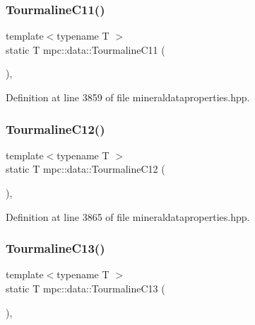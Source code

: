 \subsubsection{\texorpdfstring{Tourmaline\+C11()}{TourmalineC11()}}
{\footnotesize\ttfamily template$<$typename T $>$ \\
static T mpc\+::data\+::\+Tourmaline\+C11 (\begin{DoxyParamCaption}{ }\end{DoxyParamCaption})\hspace{0.3cm}{\ttfamily [inline]}, {\ttfamily [static]}}



Definition at line 3859 of file mineraldataproperties.\+hpp.

\mbox{\label{namespacempc_1_1data_aa3e3d8143e854e6265bc535bb310ce70}} 
\subsubsection{\texorpdfstring{Tourmaline\+C12()}{TourmalineC12()}}
{\footnotesize\ttfamily template$<$typename T $>$ \\
static T mpc\+::data\+::\+Tourmaline\+C12 (\begin{DoxyParamCaption}{ }\end{DoxyParamCaption})\hspace{0.3cm}{\ttfamily [inline]}, {\ttfamily [static]}}



Definition at line 3865 of file mineraldataproperties.\+hpp.

\mbox{\label{namespacempc_1_1data_a00b038ad8ce6e6d0f139baf3189d8881}} 
\subsubsection{\texorpdfstring{Tourmaline\+C13()}{TourmalineC13()}}
{\footnotesize\ttfamily template$<$typename T $>$ \\
static T mpc\+::data\+::\+Tourmaline\+C13 (\begin{DoxyParamCaption}{ }\end{DoxyParamCaption})\hspace{0.3cm}{\ttfamily [inline]}, {\ttfamily [static]}}



